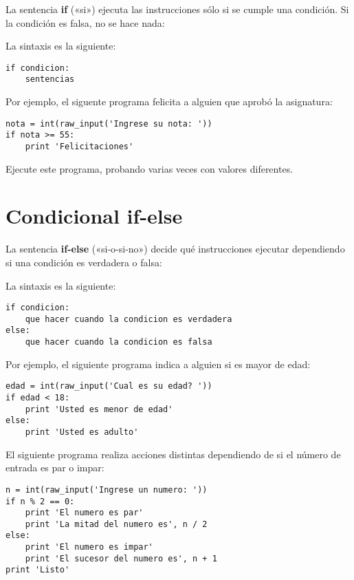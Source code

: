 La sentencia \textbf{if} («si») ejecuta las instrucciones sólo si se
cumple una condición. Si la condición es falsa, no se hace nada:

\begin{center}
  
\end{center}


La sintaxis es la siguiente:

\begin{lstlisting}
if condicion:
    sentencias
\end{lstlisting}

Por ejemplo, el siguente programa felicita a alguien que aprobó la
asignatura:

\begin{lstlisting}
nota = int(raw_input('Ingrese su nota: '))
if nota >= 55:
    print 'Felicitaciones'
\end{lstlisting}

Ejecute este programa, probando varias veces con valores diferentes.

\section{Condicional if-else}

La sentencia \textbf{if-else} («si-o-si-no») decide qué instrucciones
ejecutar dependiendo si una condición es verdadera o falsa:

\begin{center}
  
\end{center}


La sintaxis es la siguiente:

\begin{lstlisting}
if condicion:
    que hacer cuando la condicion es verdadera
else:
    que hacer cuando la condicion es falsa
\end{lstlisting}

Por ejemplo, el siguiente programa indica a alguien si es mayor de edad:

\begin{lstlisting}
edad = int(raw_input('Cual es su edad? '))
if edad < 18:
    print 'Usted es menor de edad'
else:
    print 'Usted es adulto'
\end{lstlisting}

El siguiente programa realiza acciones distintas dependiendo de si el
número de entrada es par o impar:

\begin{lstlisting}
n = int(raw_input('Ingrese un numero: '))
if n % 2 == 0:
    print 'El numero es par'
    print 'La mitad del numero es', n / 2
else:
    print 'El numero es impar'
    print 'El sucesor del numero es', n + 1
print 'Listo'
\end{lstlisting}

